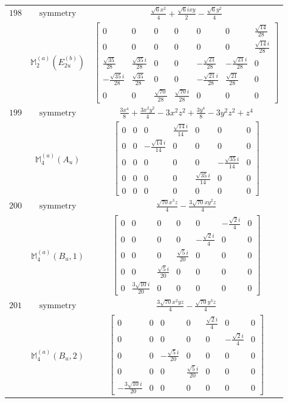 \documentclass[fleqn,8pt,landscape]{jsarticle}
\begin{document}
\begin{longtable}{ccc}
$ 198 $ & $ \text{symmetry} $ & $ \frac{\sqrt{6} x^{2}}{4} + \frac{\sqrt{6} i x y}{2} - \frac{\sqrt{6} y^{2}}{4} $ \\
$  $ & $ \mathbb{M}_{2}^{(a)}(E_{2u}^{(b)}) $ & $ \begin{bmatrix} 0 & 0 & 0 & 0 & 0 & 0 & \frac{\sqrt{14}}{28} \\ 0 & 0 & 0 & 0 & 0 & 0 & \frac{\sqrt{14} i}{28} \\ \frac{\sqrt{35}}{28} & \frac{\sqrt{35} i}{28} & 0 & 0 & - \frac{\sqrt{21}}{28} & - \frac{\sqrt{21} i}{28} & 0 \\ - \frac{\sqrt{35} i}{28} & \frac{\sqrt{35}}{28} & 0 & 0 & - \frac{\sqrt{21} i}{28} & \frac{\sqrt{21}}{28} & 0 \\ 0 & 0 & \frac{\sqrt{70}}{28} & \frac{\sqrt{70} i}{28} & 0 & 0 & 0 \end{bmatrix} $ \\ \hline
$ 199 $ & $ \text{symmetry} $ & $ \frac{3 x^{4}}{8} + \frac{3 x^{2} y^{2}}{4} - 3 x^{2} z^{2} + \frac{3 y^{4}}{8} - 3 y^{2} z^{2} + z^{4} $ \\
$  $ & $ \mathbb{M}_{4}^{(a)}(A_{u}) $ & $ \begin{bmatrix} 0 & 0 & 0 & \frac{\sqrt{14} i}{14} & 0 & 0 & 0 \\ 0 & 0 & - \frac{\sqrt{14} i}{14} & 0 & 0 & 0 & 0 \\ 0 & 0 & 0 & 0 & 0 & - \frac{\sqrt{35} i}{14} & 0 \\ 0 & 0 & 0 & 0 & \frac{\sqrt{35} i}{14} & 0 & 0 \\ 0 & 0 & 0 & 0 & 0 & 0 & 0 \end{bmatrix} $ \\ \hline
$ 200 $ & $ \text{symmetry} $ & $ \frac{\sqrt{70} x^{3} z}{4} - \frac{3 \sqrt{70} x y^{2} z}{4} $ \\
$  $ & $ \mathbb{M}_{4}^{(a)}(B_{u},1) $ & $ \begin{bmatrix} 0 & 0 & 0 & 0 & 0 & - \frac{\sqrt{2} i}{4} & 0 \\ 0 & 0 & 0 & 0 & - \frac{\sqrt{2} i}{4} & 0 & 0 \\ 0 & 0 & 0 & \frac{\sqrt{5} i}{20} & 0 & 0 & 0 \\ 0 & 0 & \frac{\sqrt{5} i}{20} & 0 & 0 & 0 & 0 \\ 0 & \frac{3 \sqrt{10} i}{20} & 0 & 0 & 0 & 0 & 0 \end{bmatrix} $ \\ \hline
$ 201 $ & $ \text{symmetry} $ & $ \frac{3 \sqrt{70} x^{2} y z}{4} - \frac{\sqrt{70} y^{3} z}{4} $ \\
$  $ & $ \mathbb{M}_{4}^{(a)}(B_{u},2) $ & $ \begin{bmatrix} 0 & 0 & 0 & 0 & \frac{\sqrt{2} i}{4} & 0 & 0 \\ 0 & 0 & 0 & 0 & 0 & - \frac{\sqrt{2} i}{4} & 0 \\ 0 & 0 & - \frac{\sqrt{5} i}{20} & 0 & 0 & 0 & 0 \\ 0 & 0 & 0 & \frac{\sqrt{5} i}{20} & 0 & 0 & 0 \\ - \frac{3 \sqrt{10} i}{20} & 0 & 0 & 0 & 0 & 0 & 0 \end{bmatrix} $ \\ \hline

\end{longtable}
\end{document}
